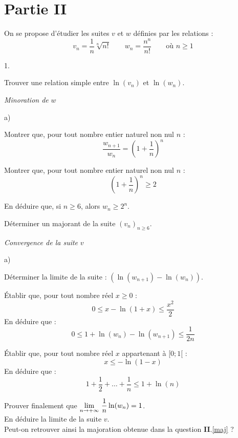 \documentclass[11pt]{article}%
\begin{document}
\section*{Partie II}

On se propose d'étudier les suites $v$ et $w$ définies par les
relations : 
\[
v_{n} = \dfrac{1}{n}\sqrt[n]{n!}\qquad w_{n} = \dfrac{n^{n}}{n!}\qquad
\text{où $n\geq 1$}
\]

\begin{noliste}{1.}
 \setlength{\itemsep}{4mm}
\item Trouver une relation simple entre $\ln (v_{n})$ et $\ln (w_{n})$.

\item \textit{Minoration de }$w$\textit{\ }

\begin{noliste}{a)}
 \setlength{\itemsep}{2mm}
\item Montrer que, pour tout nombre entier naturel non nul $n$ : 
\[
\dfrac{w_{n + 1}}{w_{n}} = \left( 1 + \dfrac{1}{n}\right) ^{n}
\]

\item Montrer que, pour tout nombre entier naturel non nul $n$ : 
\[
\left( 1 + \dfrac{1}{n}\right) ^{n}\geq 2
\]

\item En déduire que, si $n\geq 6$, alors $w_{n}\geq 2^{n}$.

\item Déterminer un majorant de la suite $(v_{n})_{n\geq 6}$.
\label{maj}
\end{noliste}

\item \textit{Convergence de la suite }$v$

\begin{noliste}{a)}
 \setlength{\itemsep}{2mm}
\item Déterminer la limite de la suite : $(\ln (w_{n + 1})-\ln
(w_{n}))$.

\item Établir que, pour tout nombre réel $x\geq 0$ : 
\[
0\leq x-\ln (1 + x)\leq \dfrac{x^{2}}{2}
\]
En déduire que : 
\[
0\leq 1 + \ln (w_{n})-\ln (w_{n + 1})\leq \dfrac{1}{2n}
\]

\item Établir que, pour tout nombre réel $x$ appartenant à $[0;1[$ : 
\[
x\leq -\ln (1-x)
\]
En déduire que : 
\[
1 + \dfrac{1}{2} + \ldots + \dfrac{1}{n}\leq 1 + \ln (n)
\]

\item Prouver finalement que ${\displaystyle \lim_{n\rightarrow + \infty
} \ }\dfrac{1}{n}\ln (w_{n}) = 1$.\\
En déduire la limite de la suite $v$.\\
Peut-on retrouver ainsi la majoration obtenue dans la question
\textbf{II}.\ref{maj} ?
\end{noliste}
\end{noliste}
\end{document}
